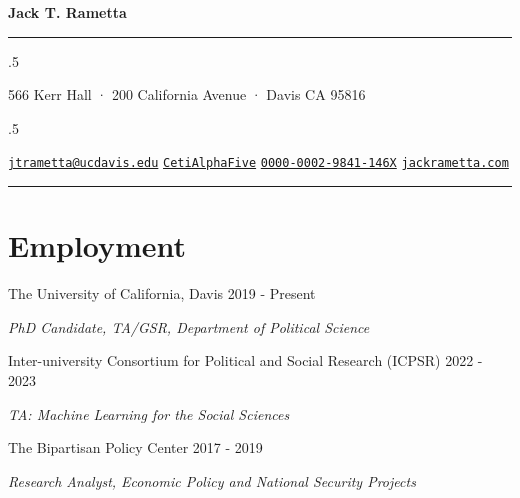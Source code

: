 \documentclass[
  11pt,
]
{article}
\providecommand{\tightlist}{%
  \setlength{\itemsep}{0pt}\setlength{\parskip}{0pt}}
\renewenvironment{itemize}{
  \begin{list}{}{
    \setlength{\leftmargin}{1.5em}
  }
}{
  \end{list}
}
\begin{document}
\centerline{\huge \bf Jack T. Rametta}

\vspace{2 mm}

\hrule

\vspace{2 mm}


\moveleft.5\hoffset\centerline{566 Kerr Hall · 200 California Avenue ·
Davis CA 95816}
\moveleft.5\hoffset\centerline{ \faEnvelopeO \hspace{1 mm} \href{mailto:}{\tt jtrametta@ucdavis.edu} \hspace{1 mm}  \faGithub \hspace{1 mm} \href{http://github.com/CetiAlphaFive}{\tt CetiAlphaFive} \hspace{1 mm}      \hspace{.5 mm} \href{https://orcid.org/0000-0002-9841-146X}{\tt 0000-0002-9841-146X} \hspace{1 mm}  \faGlobe \hspace{1 mm} \href{http://jackrametta.com}{\tt jackrametta.com}   }



\vspace{2 mm}

\hrule



\hypertarget{employment}{%
\section{Employment}\label{employment}}

The University of California, Davis \hfill 2019 - Present

\begin{itemize}
\tightlist
\item
  \emph{PhD Candidate, TA/GSR, Department of Political Science}
\end{itemize}

Inter-university Consortium for Political and Social Research (ICPSR)
\hfill 2022 - 2023

\begin{itemize}
\tightlist
\item
  \emph{TA: Machine Learning for the Social Sciences}
\end{itemize}

The Bipartisan Policy Center \hfill 2017 - 2019

\begin{itemize}
\tightlist
\item
  \emph{Research Analyst, Economic Policy and National Security
  Projects}
\end{itemize}
\end{document}
